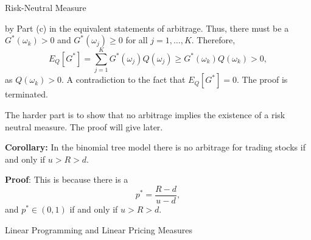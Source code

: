 \documentclass{beamer}
\begin{document}
\begin{frame}{Risk-Neutral Measure}

    {\footnotesize \footnotesize
    by Part (c) in the equivalent statements of arbitrage. Thus, there must be a $G^*(\omega_k) > 0$ and $G^*(\omega_j) \geq 0$ for all $j = 1, \ldots, K$. Therefore,
\[
E_Q[G^*] = \sum_{j=1}^K G^*(\omega_j) Q(\omega_j) \geq G^*(\omega_k) Q(\omega_k) > 0,
\]
as $Q(\omega_k) > 0$. A contradiction to the fact that $E_Q[G^*] = 0$. The proof is terminated.

The harder part is to show that no arbitrage 
implies the existence of a risk neutral measure. The proof will give later.
\vspace{1em}

\par \textbf{Corollary:} In the binomial tree model there is no arbitrage 
for trading stocks if and only if $u > R > d$.
\vspace{1em}
\par \textbf{Proof}: This is because there is a
\[
p^* = \frac{R - d}{u - d},
\]
and $p^* \in (0, 1)$ if and only if $u > R > d$.
    }
\end{frame}

\begin{frame}{Linear Programming and Linear Pricing Measures}

    {\footnotesize \footnotesize
     
    }
\end{frame}


    
\end{document}
